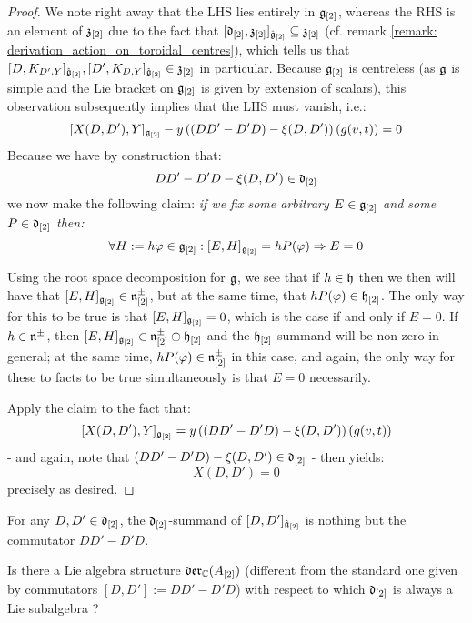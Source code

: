 \begin{proof}
                We note right away that the LHS lies entirely in $\mathfrak{g}_{[2]}$, whereas the RHS is an element of $\mathfrak{z}_{[2]}$ due to the fact that $[\mathfrak{d}_{[2]}, \mathfrak{z}_{[2]}]_{\hat{\mathfrak{g}}_{[2]}} \subseteq \mathfrak{z}_{[2]}$ (cf. remark \ref{remark: derivation_action_on_toroidal_centres}), which tells us that $[ D, K_{D', Y} ]_{\hat{\mathfrak{g}}_{[2]}}, [ D', K_{D, Y} ]_{\hat{\mathfrak{g}}_{[2]}} \in \mathfrak{z}_{[2]}$ in particular. Because $\mathfrak{g}_{[2]}$ is centreless (as $\mathfrak{g}$ is simple and the Lie bracket on $\mathfrak{g}_{[2]}$ is given by extension of scalars), this observation subsequently implies that the LHS must vanish, i.e.:
                    $$[X(D, D'), Y]_{\mathfrak{g}_{[2]}} - y \left( ( DD' - D'D) - \xi(D, D') \right)( g(v, t) ) = 0$$
                Because we have by construction that:
                    $$DD' - D'D - \xi(D, D') \in \mathfrak{d}_{[2]}$$
                we now make the following claim: \textit{if we fix some arbitrary $E \in \mathfrak{g}_{[2]}$ and some $P \in \mathfrak{d}_{[2]}$ then:}
                    $$\forall H := h \varphi \in \mathfrak{g}_{[2]}: [E, H]_{\mathfrak{g}_{[2]}} = h P( \varphi ) \Rightarrow E = 0$$

                Using the root space decomposition for $\mathfrak{g}$, we see that if $h \in \mathfrak{h}$ then we then will have that $[E, H]_{\mathfrak{g}_{[2]}} \in \mathfrak{n}^{\pm}_{[2]}$, but at the same time, that $h P(\varphi) \in \mathfrak{h}_{[2]}$. The only way for this to be true is that $[E, H]_{\mathfrak{g}_{[2]}} = 0$, which is the case if and only if $E = 0$. If $h \in \mathfrak{n}^{\pm}$, then $[E, H]_{\mathfrak{g}_{[2]}} \in \mathfrak{n}^{\pm}_{[2]} \oplus \mathfrak{h}_{[2]}$ and the $\mathfrak{h}_{[2]}$-summand will be non-zero in general; at the same time, $h P(\varphi) \in \mathfrak{n}^{\pm}_{[2]}$ in this case, and again, the only way for these to facts to be true simultaneously is that $E = 0$ necessarily. 

                Apply the claim to the fact that:
                    $$[X(D, D'), Y]_{\mathfrak{g}_{[2]}} = y \left( ( DD' - D'D) - \xi(D, D') \right)( g(v, t) )$$
                - and again, note that $( DD' - D'D) - \xi(D, D') \in \mathfrak{d}_{[2]}$ - then yields:
                    $$X(D, D') = 0$$
                precisely as desired. 
            \end{proof}
        \begin{corollary}
            For any $D, D' \in \mathfrak{d}_{[2]}$, the $\mathfrak{d}_{[2]}$-summand of $[D, D']_{\hat{\mathfrak{g}}_{[2]}}$ is nothing but the commutator $DD' - D'D$.
        \end{corollary} 
        
        \begin{question} \label{question: alternative_derivation_lie_bracket}
            Is there a Lie algebra structure $\mathfrak{der}_{\mathbb{C}}(A_{[2]})$ (different from the standard one given by commutators $[D, D'] := DD' - D'D$) with respect to which $\mathfrak{d}_{[2]}$ is always a Lie subalgebra ? 
        \end{question}
        
